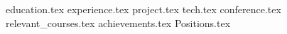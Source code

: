 \documentclass[11pt, a4paper]{awesome-cv}
\newcommand*{\sectiondir}{resume/}
\begin{document}
\makecvheader

{education.tex}
{experience.tex}
{project.tex}
{tech.tex}
{conference.tex}
{relevant_courses.tex}
{achievements.tex}
{Positions.tex}
\end{document}
